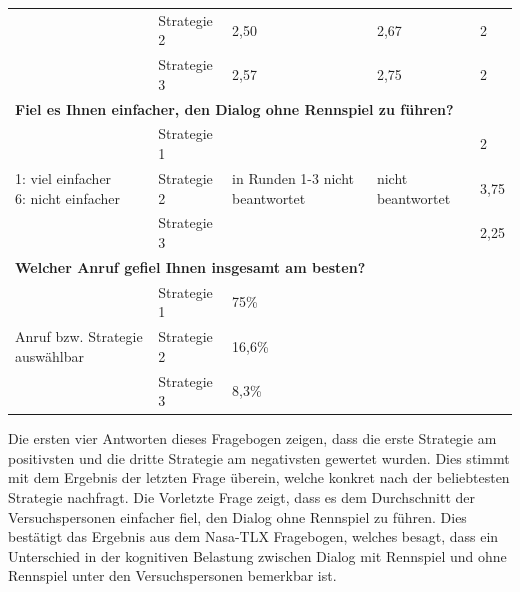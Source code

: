 \documentclass[12pt,a4paper]{scrartcl}
\begin{document}
\begin{longtable}{|p{4cm}|p{2cm}|p{2cm}|p{2cm}|p{2cm}|}
 & Strategie 2 & 2,50 & 2,67 & 2 \\
 & Strategie 3 & 2,57 & 2,75 & 2 \\
\hline
		\multicolumn{5}{l}{\textbf{Fiel es Ihnen einfacher, den Dialog ohne Rennspiel zu führen?}}\\
		\hline
\multirow{3}{4cm}{1: viel einfacher \newline  6: nicht einfacher} & Strategie 1 & \multirow{3}{2,5cm}{in Runden 1-3 nicht beantwortet} & \multirow{3}{2,5cm}{nicht beantwortet} & 2 \\
 & Strategie 2 & & & 3,75 \\
 & Strategie 3 & & & 2,25\\
\hline
		\multicolumn{5}{l}{\textbf{Welcher Anruf gefiel Ihnen insgesamt am besten?}}\\
		\hline
\multirow{3}{4cm}{Anruf bzw. Strategie auswählbar} & Strategie 1 & 75\% & & \\
 & Strategie 2 & 16,6\% && \\
 & Strategie 3 & 8,3\% && \\
\hline
\end{longtable}

Die ersten vier Antworten dieses Fragebogen zeigen, dass die erste Strategie am positivsten und die dritte Strategie am negativsten gewertet wurden. Dies stimmt mit dem Ergebnis der letzten Frage überein, welche konkret nach der beliebtesten Strategie nachfragt. Die Vorletzte Frage zeigt, dass es dem Durchschnitt der Versuchspersonen einfacher fiel, den Dialog ohne Rennspiel zu führen. Dies bestätigt das Ergebnis aus dem Nasa-TLX Fragebogen, welches besagt, dass ein Unterschied in der kognitiven Belastung zwischen Dialog mit Rennspiel und ohne Rennspiel unter den Versuchspersonen bemerkbar ist.  
\end{document}
